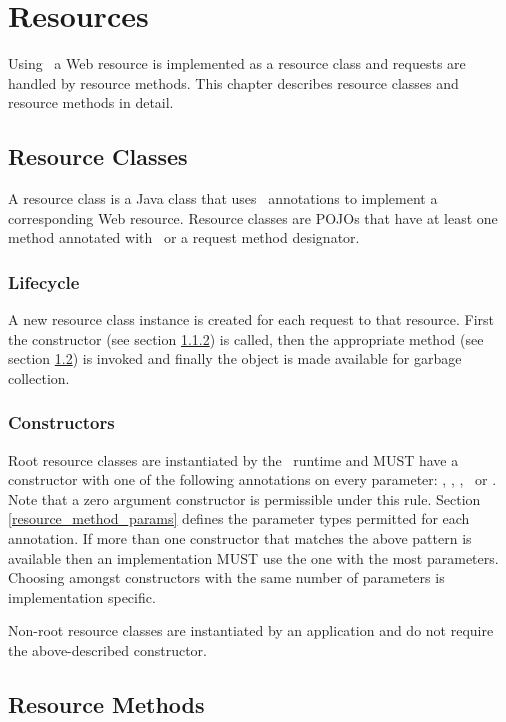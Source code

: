 \chapter{Resources}
\label{resources}

Using \jaxrs\, a Web resource is implemented as a resource class and requests are handled by resource methods. This chapter describes resource classes and resource methods in detail.

\section{Resource Classes}

A resource class is a Java class that uses \jaxrs\ annotations to implement a corresponding Web resource. Resource classes are POJOs that have at least one method annotated with \Path\ or a request method designator.

\subsection{Lifecycle}

A new resource class instance is created for each request to that resource. First the constructor (see section \ref{resource_class_constructor}) is called, then the appropriate method (see section \ref{resource_method}) is invoked and finally the object is made available for garbage collection.

\subsection{Constructors}
\label{resource_class_constructor}

Root resource classes are instantiated by the \jaxrs\ runtime and MUST have a constructor with one of the following annotations on every parameter: \Context, \HeaderParam, \MatrixParam, \QueryParam\ or \PathParam. Note that a zero argument constructor is permissible under this rule. Section \ref{resource_method_params} defines the parameter types permitted for each annotation. If more than one constructor that matches the above pattern is available then an implementation MUST use the one with the most parameters. Choosing amongst constructors with the same number of parameters is implementation specific.

Non-root resource classes are instantiated by an application and do not require the above-described constructor.

\section{Resource Methods}
\label{resource_method}

